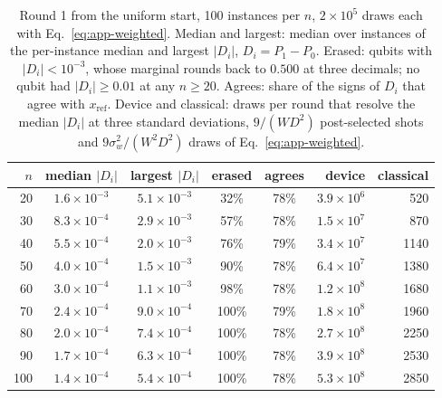 \begin{table}[ht]
\centering
\small
\caption{Round 1 from the uniform start, 100 instances per $n$, $2\times10^5$ draws each with Eq.~\eqref{eq:app-weighted}. Median and largest: median over instances of the per-instance median and largest $|D_i|$, $D_i=P_1-P_0$. Erased: qubits with $|D_i|<10^{-3}$, whose marginal rounds back to $0.500$ at three decimals; no qubit had $|D_i|\ge0.01$ at any $n\ge20$. Agrees: share of the signs of $D_i$ that agree with $x_{\mathrm{ref}}$. Device and classical: draws per round that resolve the median $|D_i|$ at three standard deviations, $9/(WD^2)$ post-selected shots and $9\sigma_w^2/(W^2D^2)$ draws of Eq.~\eqref{eq:app-weighted}.}
\label{tab:app-round1}
\begin{tabular}{rccccrr}
\toprule
$n$ & median $|D_i|$ & largest $|D_i|$ & erased & agrees & device & classical \\
\midrule
20 & $1.6\times10^{-3}$ & $5.1\times10^{-3}$ & 32\% & 78\% & $3.9\times10^6$ & 520 \\
30 & $8.3\times10^{-4}$ & $2.9\times10^{-3}$ & 57\% & 78\% & $1.5\times10^7$ & 870 \\
40 & $5.5\times10^{-4}$ & $2.0\times10^{-3}$ & 76\% & 79\% & $3.4\times10^7$ & 1140 \\
50 & $4.0\times10^{-4}$ & $1.5\times10^{-3}$ & 90\% & 78\% & $6.4\times10^7$ & 1380 \\
60 & $3.0\times10^{-4}$ & $1.1\times10^{-3}$ & 98\% & 78\% & $1.2\times10^8$ & 1680 \\
70 & $2.4\times10^{-4}$ & $9.0\times10^{-4}$ & 100\% & 79\% & $1.8\times10^8$ & 1960 \\
80 & $2.0\times10^{-4}$ & $7.4\times10^{-4}$ & 100\% & 78\% & $2.7\times10^8$ & 2250 \\
90 & $1.7\times10^{-4}$ & $6.3\times10^{-4}$ & 100\% & 78\% & $3.9\times10^8$ & 2530 \\
100 & $1.4\times10^{-4}$ & $5.4\times10^{-4}$ & 100\% & 78\% & $5.3\times10^8$ & 2850 \\
\bottomrule
\end{tabular}
\end{table}

